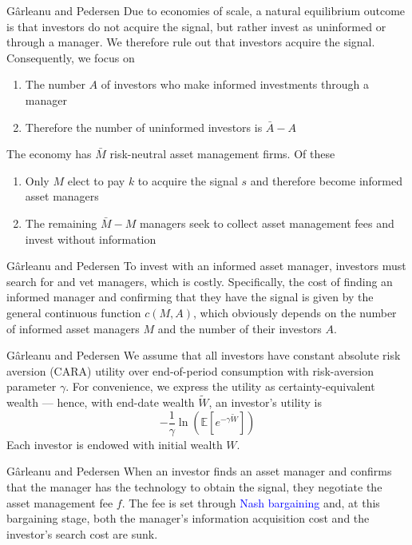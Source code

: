 \documentclass[aspectratio=169,xcolor=dvipsnames]{beamer}
\begin{document}
\begin{frame}{G\^arleanu and Pedersen}
    Due to economies of scale, a natural equilibrium outcome is that investors do not acquire the signal, but rather invest as uninformed or through a manager. We therefore rule out that investors acquire the signal. Consequently, we focus on
    \begin{enumerate}
        \item The number $A$ of investors who make informed investments through a manager
        \item Therefore the number of uninformed investors is $\bar A - A$
    \end{enumerate}
    The economy has $\bar M$ risk-neutral asset management firms. Of these
    \begin{enumerate}
        \item Only $M$ elect to pay $k$ to acquire the signal $s$ and therefore become informed asset managers
        \item The remaining $\bar M - M$ managers seek to collect asset management fees and invest without information
    \end{enumerate}
\end{frame}

\begin{frame}{G\^arleanu and Pedersen}
    To invest with an informed asset manager, investors must search for and vet managers, which is costly. Specifically, the cost of finding an informed manager and confirming that they have the signal is given by the general continuous function $c(M, A)$, which obviously depends on the number of informed asset managers $M$ and the number of their investors $A$.
\end{frame}

\begin{frame}{G\^arleanu and Pedersen}
    We assume that all investors have constant absolute risk aversion (CARA) utility over end-of-period consumption with risk-aversion parameter $\gamma$. For convenience, we express the utility as certainty-equivalent wealth --- hence, with end-date wealth $\tilde W$, an investor's utility is
    \[
        -\frac{1}{\gamma} \ln\left(\mathbb{E}\left[e^{-\gamma \tilde W}\right]\right)
    \]
    Each investor is endowed with initial wealth $W$.
\end{frame}

\begin{frame}{G\^arleanu and Pedersen}
    When an investor finds an asset manager and confirms that the manager has the technology to obtain the signal, they negotiate the asset management fee $f$. The fee is set through \textcolor{blue}{Nash bargaining} and, at this bargaining stage, both the manager's information acquisition cost and the investor's search cost are sunk.
\end{frame}
\end{document}
